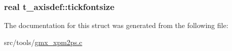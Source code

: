 \hypertarget{structt__axisdef_a2c86bdd3051e88296a60d4e9ed84088d}{
\subsubsection[{tickfontsize}]{\setlength{\rightskip}{0pt plus 5cm}real {\bf t\-\_\-axisdef\-::tickfontsize}}}\label{structt__axisdef_a2c86bdd3051e88296a60d4e9ed84088d}


\-The documentation for this struct was generated from the following file\-:\begin{DoxyCompactItemize}
\item 
src/tools/\hyperlink{gmx__xpm2ps_8c}{gmx\-\_\-xpm2ps.\-c}\end{DoxyCompactItemize}
